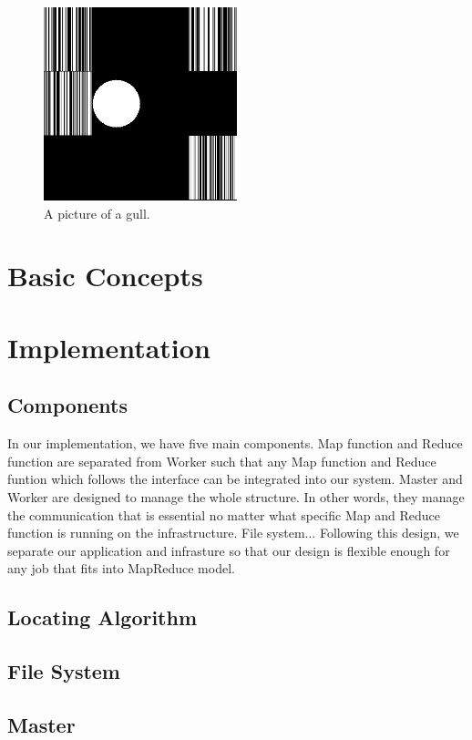 \documentclass[12pt]{article}
\begin{document}
\begin{figure}[h!]
  
  \centering
    \includegraphics[width=0.5\textwidth]{1.jpg}
    \caption{A picture of a gull.}
\end{figure}

\section {Basic Concepts}


\section {Implementation}
\subsection{Components}

In our implementation, we have five main components. 
Map function and Reduce function are separated from Worker such that any Map function and Reduce funtion which
follows the interface can be integrated into our system.
Master and Worker are designed to manage the whole structure. In other words, they manage the communication that
is essential no matter what specific Map and Reduce function is running on the infrastructure.
File system...
Following this design, we separate our application and infrasture so that our design is flexible enough
for any job that fits into MapReduce model. 
\subsection{Locating Algorithm }
\subsection{File System}
\subsection{Master}
\end{document}
